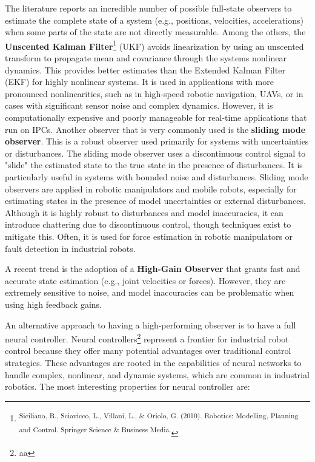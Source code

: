 The literature reports an incredible number of possible full-state
observers to estimate the complete state of a system (e.g., positions,
velocities, accelerations) when some parts of the state are not directly
measurable. Among the others, the \textbf{Unscented Kalman
Filter}\footnote{\textsuperscript{Siciliano, B., Sciavicco, L., Villani,
  L., \& Oriolo, G. (2010). Robotics: Modelling, Planning and Control.
  Springer Science \& Business Media.}} (UKF) avoids linearization by
using an unscented transform to propagate mean and covariance through
the system\textquotesingle s nonlinear dynamics. This provides better
estimates than the Extended Kalman Filter (EKF) for highly nonlinear
systems. It is used in applications with more pronounced nonlinearities,
such as in high-speed robotic navigation, UAVs, or in cases with
significant sensor noise and complex dynamics. However, it is
computationally expensive and poorly manageable for real-time
applications that run on IPCs. Another observer that is very commonly
used is the \textbf{sliding mode observer}. This is a robust observer
used primarily for systems with uncertainties or disturbances. The
sliding mode observer uses a discontinuous control signal to "slide" the
estimated state to the true state in the presence of disturbances. It is
particularly useful in systems with bounded noise and disturbances.
Sliding mode observers are applied in robotic manipulators and mobile
robots, especially for estimating states in the presence of model
uncertainties or external disturbances. Although it is highly robust to
disturbances and model inaccuracies, it can introduce chattering due to
discontinuous control, though techniques exist to mitigate this. Often,
it is used for force estimation in robotic manipulators or fault
detection in industrial robots.

A recent trend is the adoption of a \textbf{High-Gain Observer} that
grants fast and accurate state estimation (e.g., joint velocities or
forces). However, they are extremely sensitive to noise, and model
inaccuracies can be problematic when using high feedback gains.

An alternative approach to having a high-performing observer is to have
a full neural controller. Neural controllers\footnote{aa} represent a
frontier for industrial robot control because they offer many potential
advantages over traditional control strategies. These advantages are
rooted in the capabilities of neural networks to handle complex,
nonlinear, and dynamic systems, which are common in industrial robotics.
The most interesting properties for neural controller are:

